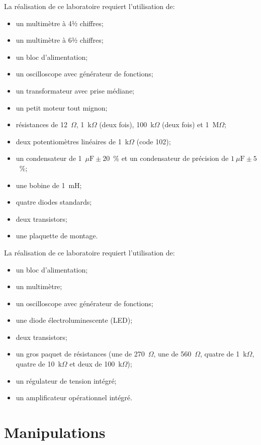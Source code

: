 \documentclass[canadien,12pt,oneside,letterpaper]{article}
\begin{document}
La réalisation de ce laboratoire requiert l'utilisation de:
\begin{itemize}
\item un multimètre à 4½ chiffres;
\item un multimètre à 6½ chiffres;
\item un bloc d'alimentation;
\item un oscilloscope avec générateur de fonctions;
\item un transformateur avec prise médiane;
\item un petit moteur tout mignon;
\item résistances de 12~$\Omega$, 1~k$\Omega$ (deux fois), 100~k$\Omega$ (deux fois) et 1~M$\Omega$;
\item deux potentiomètres linéaires de 1~k$\Omega$ (code 102);
\item un condensateur de 1~$\mu\mathrm{F}\pm20$~\% et un condensateur de précision de $1~\mu\mathrm{F}\pm5$~\%;
\item une bobine de 1~mH;
\item quatre diodes standards;
\item deux transistors;
\item une plaquette de montage.
\end{itemize}

La réalisation de ce laboratoire requiert l'utilisation de:
\begin{itemize}
\item un bloc d'alimentation;
\item un multimètre;
\item un oscilloscope avec générateur de fonctions;
\item une diode électroluminescente (LED);
\item deux transistors;
\item un gros paquet de résistances (une de 270~$\Omega$, une de 560~$\Omega$, quatre de 1~k$\Omega$, quatre de 10~k$\Omega$ et deux de 100~k$\Omega$);
\item un régulateur de tension intégré;
\item un amplificateur opérationnel intégré.
\end{itemize}


\section{Manipulations}

\setlength{\parskip}{1ex plus 0.5ex minus 0.2ex}
\end{document}
